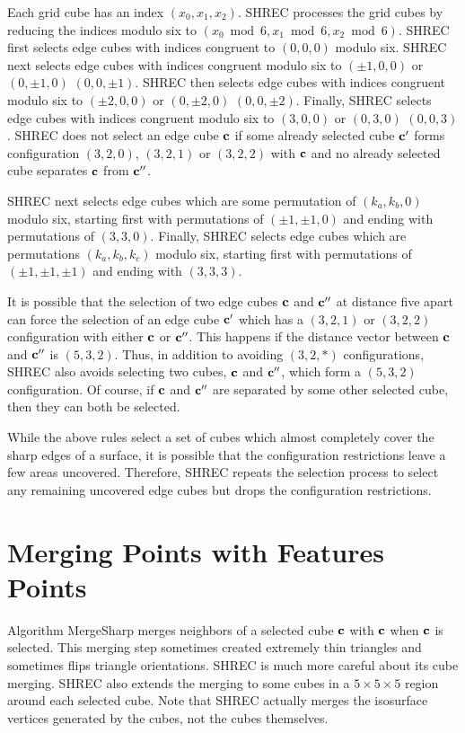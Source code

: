 Each grid cube has an index $(x_0, x_1, x_2)$.
SHREC processes the grid cubes by reducing the indices modulo six
to $(x_0 \bmod 6, x_1 \bmod 6, x_2 \bmod 6)$.
SHREC first selects edge cubes with indices congruent to $(0,0,0)$ modulo six.
SHREC next selects edge cubes with indices congruent modulo six
to $(\pm 1,0,0)$ or $(0, \pm 1, 0)$ $(0, 0, \pm 1)$.
SHREC then selects edge cubes with indices congruent modulo six
to $(\pm 2,0,0)$ or $(0, \pm 2, 0)$ $(0, 0, \pm 2)$.
Finally, SHREC selects edge cubes with indices congruent modulo six
to $(3,0,0)$ or $(0, 3, 0)$ $(0, 0, 3)$.
SHREC does not select an edge cube $\mathbf{c}$ if some already selected cube $\mathbf{c}'$
forms configuration $(3,2,0)$, $(3,2,1)$ or $(3,2,2)$ with $\mathbf{c}$
and no already selected cube separates $\mathbf{c}$ from $\mathbf{c}''$.

SHREC next selects edge cubes which are some permutation
of $(k_a,k_b,0)$ modulo six,
starting first with permutations of $(\pm 1, \pm 1, 0)$
and ending with permutations of $(3, 3, 0)$.
Finally, SHREC selects edge cubes which are permutations
$(k_a, k_b, k_c)$ modulo six,
starting first with permutations of $(\pm 1, \pm 1, \pm 1)$
and ending with $(3, 3, 3)$.

It is possible that the selection of two edge cubes $\mathbf{c}$ and $\mathbf{c}''$
at distance five apart can force the selection of an edge cube $\mathbf{c}'$
which has a $(3,2,1)$ or $(3,2,2)$ configuration 
with either $\mathbf{c}$ or $\mathbf{c}''$.
This happens if the distance vector between $\mathbf{c}$ and $\mathbf{c}''$
is $(5,3,2)$.
Thus, in addition to avoiding $(3,2,*)$ configurations,
SHREC also avoids selecting two cubes, $\mathbf{c}$ and $\mathbf{c}''$, 
which form a $(5,3,2)$ configuration.
Of course, if $\mathbf{c}$ and $\mathbf{c}''$ are separated by some other selected cube,
then they can both be selected.

While the above rules select a set of cubes which almost completely cover
the sharp edges of a surface,
it is possible that the configuration restrictions leave a few areas uncovered.
Therefore, SHREC repeats the selection process to select any remaining
uncovered edge cubes but drops the configuration restrictions.


\section{Merging Points with Features Points}
\label{section:merging}

Algorithm MergeSharp merges neighbors of a selected cube $\mathbf{c}$ 
with $\mathbf{c}$ when $\mathbf{c}$ is selected.
This merging step sometimes created extremely thin triangles and 
sometimes flips triangle orientations.
SHREC is much more careful about its cube merging.
SHREC also extends the merging to some cubes in a $5 \times 5 \times 5$ region 
around each selected cube.
Note that SHREC actually merges the isosurface vertices generated by the cubes,
not the cubes themselves.


